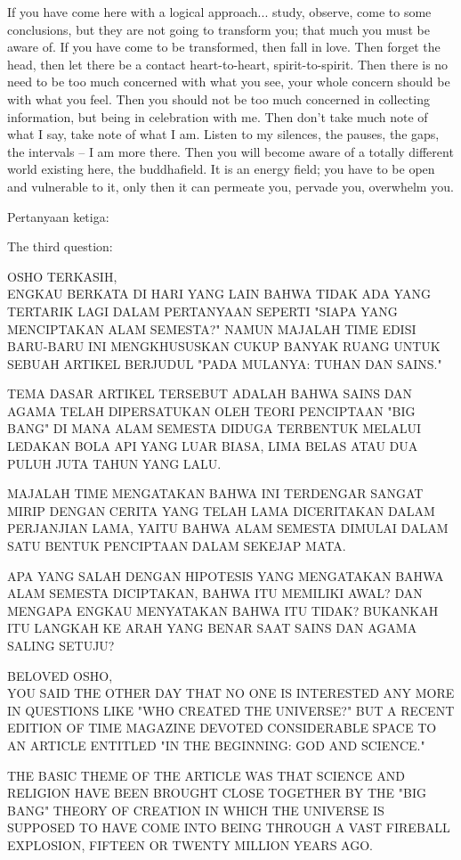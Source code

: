 \english
If you have come here with a logical approach... study, observe, come to some
conclusions, but they are not going to transform you; that much you must be aware of. If you have come to be transformed, then fall in love. Then forget the head, then let there be a contact heart-to-heart, spirit-to-spirit. Then there is no need to be too much concerned with what you see, your whole concern should be with what you feel. Then you should not be too much concerned in collecting information, but being in celebration with me. Then don't take much note of what I say, take note of what I am. Listen to my silences, the pauses, the gaps, the intervals -- I am more there. Then you will become aware of a totally different world existing here, the buddhafield. It is an energy field; you have to be open and vulnerable to it, only then it can permeate you, pervade you, overwhelm you.

\bahasa
Pertanyaan ketiga:

\english
The third question:

\bahasa
OSHO TERKASIH,\\
ENGKAU BERKATA DI HARI YANG LAIN BAHWA TIDAK ADA YANG TERTARIK LAGI DALAM PERTANYAAN SEPERTI "SIAPA YANG MENCIPTAKAN ALAM SEMESTA?" NAMUN MAJALAH TIME EDISI BARU-BARU INI MENGKHUSUSKAN CUKUP BANYAK RUANG UNTUK SEBUAH ARTIKEL BERJUDUL "PADA MULANYA: TUHAN DAN SAINS."

TEMA DASAR ARTIKEL TERSEBUT ADALAH BAHWA SAINS DAN AGAMA TELAH DIPERSATUKAN OLEH TEORI PENCIPTAAN "BIG BANG" DI MANA ALAM SEMESTA DIDUGA TERBENTUK MELALUI LEDAKAN BOLA API YANG LUAR BIASA, LIMA BELAS ATAU DUA PULUH JUTA TAHUN YANG LALU.

MAJALAH TIME MENGATAKAN BAHWA INI TERDENGAR SANGAT MIRIP DENGAN CERITA YANG TELAH LAMA DICERITAKAN DALAM PERJANJIAN LAMA, YAITU BAHWA ALAM SEMESTA DIMULAI DALAM SATU BENTUK PENCIPTAAN DALAM SEKEJAP MATA.

APA YANG SALAH DENGAN HIPOTESIS YANG MENGATAKAN BAHWA ALAM SEMESTA DICIPTAKAN, BAHWA ITU MEMILIKI AWAL? DAN MENGAPA ENGKAU MENYATAKAN BAHWA ITU TIDAK? BUKANKAH ITU LANGKAH KE ARAH YANG BENAR SAAT SAINS DAN AGAMA SALING SETUJU?

\english
BELOVED OSHO,\\
YOU SAID THE OTHER DAY THAT NO ONE IS INTERESTED ANY MORE IN QUESTIONS LIKE "WHO CREATED THE UNIVERSE?" BUT A RECENT EDITION OF TIME MAGAZINE DEVOTED CONSIDERABLE SPACE TO AN ARTICLE ENTITLED "IN THE BEGINNING: GOD AND SCIENCE."

THE BASIC THEME OF THE ARTICLE WAS THAT SCIENCE AND RELIGION HAVE BEEN BROUGHT CLOSE TOGETHER BY THE "BIG BANG" THEORY OF CREATION IN WHICH THE UNIVERSE IS SUPPOSED TO HAVE COME INTO BEING THROUGH A VAST FIREBALL EXPLOSION, FIFTEEN OR TWENTY MILLION YEARS AGO.

